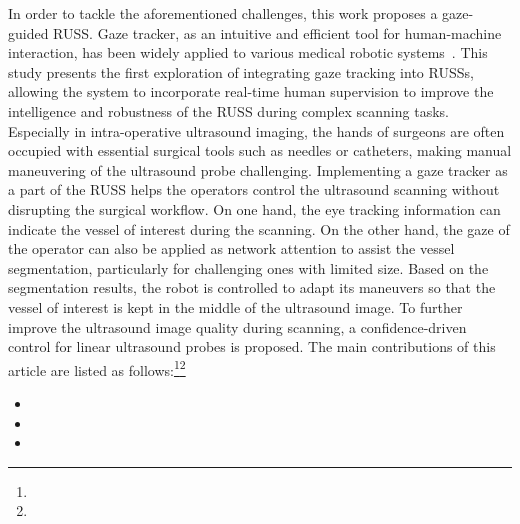 \par
In order to tackle the aforementioned challenges, this work proposes a gaze-guided RUSS. Gaze tracker, as an intuitive and efficient tool for human-machine interaction, has been widely applied to various medical robotic systems~\cite{noonan2008gaze,tong2015retrofit,guo2019novel}. This study presents the first exploration of integrating gaze tracking into RUSSs, allowing the system to incorporate real-time human supervision to improve the intelligence and robustness of the RUSS during complex scanning tasks. 
Especially in intra-operative ultrasound imaging, the hands of surgeons are often occupied with essential surgical tools such as needles or catheters, making manual maneuvering of the ultrasound probe challenging. Implementing a gaze tracker as a part of the RUSS helps the operators control the ultrasound scanning without disrupting the surgical workflow.
On one hand, the eye tracking information can indicate the vessel of interest during the scanning. On the other hand, the gaze of the operator can also be applied as network attention to assist the vessel segmentation, particularly for challenging ones with limited size. Based on the segmentation results, the robot is controlled to adapt its maneuvers so that the vessel of interest is kept in the middle of the ultrasound image. To further improve the ultrasound image quality during scanning, a confidence-driven control for linear ultrasound probes is proposed. The main contributions of this article are listed as follows:\footnote{}\footnote{}
\begin{itemize}
  \item {}
  \item  {}
  \item {}
\end{itemize}

